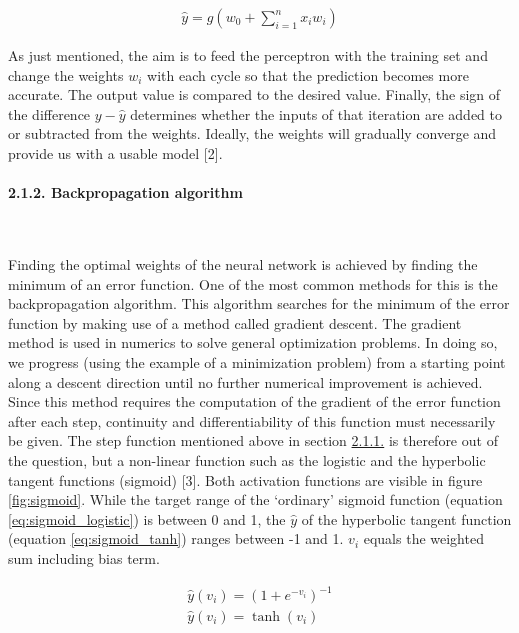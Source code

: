 \documentclass[
]{article}
\begin{document}
\begin{align} \label{eq:perceptron}
\hat{y}=g(w_{0}+\sum_{i=1}^{n}x_{i}w_{i})
\end{align}

As just mentioned, the aim is to feed the perceptron with the training
set and change the weights \(w_{i}\) with each cycle so that the
prediction becomes more accurate. The output value is compared to the
desired value. Finally, the sign of the difference \(y-\hat{y}\)
determines whether the inputs of that iteration are added to or
subtracted from the weights. Ideally, the weights will gradually
converge and provide us with a usable model {[}2{]}.

\newpage

\hypertarget{backprogation_algorithm}{%
\paragraph{2.1.2. Backpropagation
algorithm}\label{backprogation_algorithm}}

~

Finding the optimal weights of the neural network is achieved by finding
the minimum of an error function. One of the most common methods for
this is the backpropagation algorithm. This algorithm searches for the
minimum of the error function by making use of a method called gradient
descent. The gradient method is used in numerics to solve general
optimization problems. In doing so, we progress (using the example of a
minimization problem) from a starting point along a descent direction
until no further numerical improvement is achieved. Since this method
requires the computation of the gradient of the error function after
each step, continuity and differentiability of this function must
necessarily be given. The step function mentioned above in section
\protect\hyperlink{perceptron}{2.1.1.} is therefore out of the question,
but a non-linear function such as the logistic and the hyperbolic
tangent functions (sigmoid) {[}3{]}. Both activation functions are
visible in figure \ref{fig:sigmoid}. While the target range of the
`ordinary' sigmoid function (equation \ref{eq:sigmoid_logistic}) is
between 0 and 1, the \(\hat{y}\) of the hyperbolic tangent function
(equation \ref{eq:sigmoid_tanh}) ranges between -1 and 1. \(v_{i}\)
equals the weighted sum including bias term.

\begin{eqnarray}
\hat{y}(v_{i})=(1+e^{-v_{i}})^{-1} \label{eq:sigmoid_logistic} \\
\hat{y}(v_{i})=\tanh(v_{i}) \label{eq:sigmoid_tanh}
\end{eqnarray}
\end{document}
